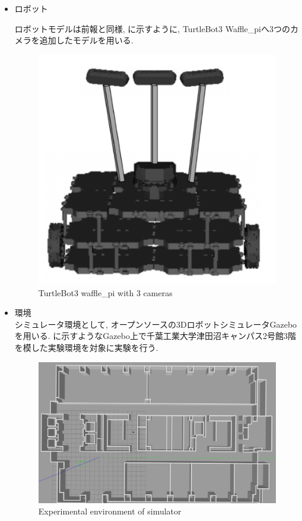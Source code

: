\begin{itemize}
  \item ロボット

ロボットモデルは前報\cite{okada1}\cite{okada2}と同様, に示すように, TurtleBot3 Waffle\_piへ3つのカメラを追加したモデルを用いる.

\begin{figure}[hbtp]
  \centering
 \includegraphics[keepaspectratio, scale=0.22]
      {images/Waffle_pi.png}
 \caption{TurtleBot3 waffle\_pi with 3 cameras}
 \label{Fig:waffle_pi}
\end{figure}

\item 環境\\
シミュレータ環境として, オープンソースの3DロボットシミュレータGazeboを用いる. に示すようなGazebo上で千葉工業大学津田沼キャンパス2号館3階を模した実験環境を対象に実験を行う.

\begin{figure}[hbtp]
  \centering
 \includegraphics[keepaspectratio, scale=0.12]
      {images/tsudanuma2-3_simorg.png}
 \caption{Experimental environment of simulator}
 \label{Fig:sim}
\end{figure}

\end{itemize}

